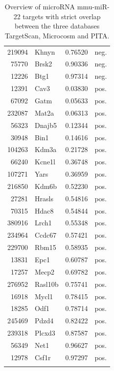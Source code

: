 \documentclass{article}
\begin{document}
\begin{Schunk}
\begin{longtable}{rlrl}
  219094 & Khnyn & 0.76520 & neg. \\ 
  75770 & Brsk2 & 0.90336 & neg. \\ 
  12226 & Btg1 & 0.97314 & neg. \\ 
  12391 & Cav3 & 0.03830 & pos. \\ 
  67092 & Gatm & 0.05633 & pos. \\ 
  232087 & Mat2a & 0.06313 & pos. \\ 
  56323 & Dnajb5 & 0.12344 & pos. \\ 
  30948 & Bin1 & 0.14616 & pos. \\ 
  104263 & Kdm3a & 0.21728 & pos. \\ 
  66240 & Kcne1l & 0.36748 & pos. \\ 
  107271 & Yars & 0.36959 & pos. \\ 
  216850 & Kdm6b & 0.52230 & pos. \\ 
  27281 & Hrasls & 0.54816 & pos. \\ 
  70315 & Hdac8 & 0.54844 & pos. \\ 
  380916 & Lrch1 & 0.55348 & pos. \\ 
  234964 & Ccdc67 & 0.57421 & pos. \\ 
  229700 & Rbm15 & 0.58935 & pos. \\ 
  13831 & Epc1 & 0.60787 & pos. \\ 
  17257 & Mecp2 & 0.69782 & pos. \\ 
  276952 & Rasl10b & 0.75741 & pos. \\ 
  16918 & Mycl1 & 0.78415 & pos. \\ 
  18285 & Odf1 & 0.78714 & pos. \\ 
  245469 & Pdzd4 & 0.82422 & pos. \\ 
  239318 & Plcxd3 & 0.87587 & pos. \\ 
  56349 & Net1 & 0.96627 & pos. \\ 
  12978 & Csf1r & 0.97297 & pos. \\ 
   \hline
\hline
\caption{Overview of microRNA mmu-miR-22 targets with strict overlap between the three databases TargetScan, Microcosm and PITA.}
\end{longtable}\end{Schunk}
       
\end{document}
